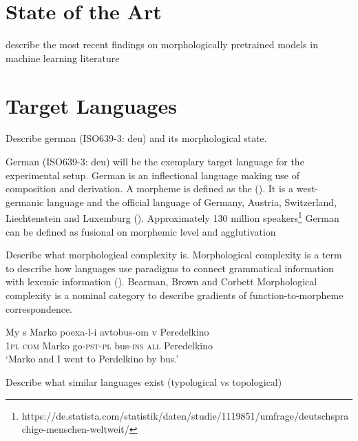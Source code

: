 \section{State of the Art}
\label{sec:state-of-the-art}
describe the most recent findings on morphologically pretrained models in machine learning literature

\section{Target Languages}
\label{sec:target-languages}
Describe german (ISO639-3: deu) and its morphological state.

German (ISO639-3: deu) will be the exemplary target language for the experimental setup.
German is an inflectional language making use of composition and derivation.
A morpheme is defined as the  (\cite{morpheme}).
It is a west-germanic language and the official language of Germany, Austria, Switzerland, Liechtenstein and Luxemburg (\cite{METZLER2016}).
Approximately 130 million speakers\footnote{https://de.statista.com/statistik/daten/studie/1119851/umfrage/deutschsprachige-menschen-weltweit/}
German can be defined as fusional on morphemic level and agglutivation


Describe what morphological complexity is.
Morphological complexity is a term to describe how languages use paradigms to connect grammatical information with lexemic information (\cite{MORPHOLOGICALCOMPLEXITY}).
Bearman, Brown and Corbett
Morphological complexity is a nominal category to describe gradients of function-to-morpheme correspondence.
\cite{ATTENTION}
\begin{exe}
    \ex
    \gll  My s Marko poexa-l-i avtobus-om v Peredelkino \\
    1\textsc{pl} \textsc{com} Marko go-\textsc{pst}-\textsc{pl} bus-\textsc{ins} \textsc{all} Peredelkino \\
    \glt  `Marko and I went to Perdelkino by bus.'
\end{exe}



Describe what similar languages exist (typological vs topological)
